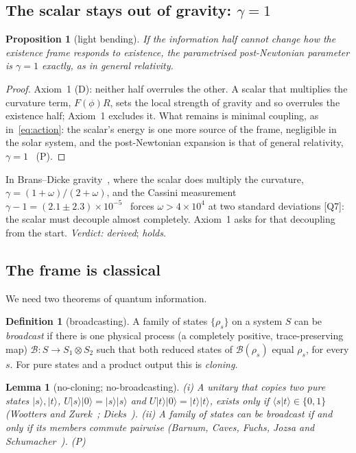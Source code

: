 \documentclass[11pt,a4paper]{article}
\newtheorem{proposition}{Proposition}
\newtheorem{lemma}{Lemma}
\theoremstyle{definition}
\newtheorem{definition}{Definition}
\theoremstyle{remark}
\newcommand{\chk}[1]{\textsf{[#1]}}
\newcommand{\tagD}{\textsf{(D)}}
\newcommand{\tagP}{\textsf{(P)}}
\newcommand{\ket}[1]{\lvert #1\rangle}
\theoremstyle{definition}
\begin{document}
\subsection{The scalar stays out of gravity: \texorpdfstring{$\gamma=1$}{gamma = 1}}

\begin{proposition}[light bending]\label{pr:gamma}
If the information half cannot change how the existence frame responds to existence, the parametrised post-Newtonian parameter is
$\gamma=1$ exactly, as in general relativity.
\end{proposition}

\begin{proof}
Axiom~1 \tagD: neither half overrules the other. A scalar that multiplies the curvature term, $F(\phi)R$, sets the local strength of gravity
and so overrules the existence half; Axiom~1 excludes it. What remains is minimal coupling, as in~\eqref{eq:action}: the scalar's energy is
one more source of the frame, negligible in the solar system, and the post-Newtonian expansion is that of general relativity,
$\gamma=1$~\cite{will} \tagP.
\end{proof}

In Brans--Dicke gravity~\cite{bd}, where the scalar does multiply the curvature, $\gamma=(1+\omega)/(2+\omega)$, and the Cassini
measurement $\gamma-1=(2.1\pm2.3)\times10^{-5}$~\cite{cassini} forces $\omega>4\times10^4$ at two standard deviations \chk{Q7}: the
scalar must decouple almost completely. Axiom~1 asks for that decoupling from the start. \emph{Verdict: derived}; \emph{holds}.

\subsection{The frame is classical}

We need two theorems of quantum information.

\begin{definition}[broadcasting]
A family of states $\{\rho_s\}$ on a system $S$ can be \emph{broadcast} if there is one physical process (a completely positive,
trace-preserving map) $\mathcal B:S\to S_1\otimes S_2$ such that both reduced states of $\mathcal B(\rho_s)$ equal $\rho_s$, for every $s$.
For pure states and a product output this is \emph{cloning}.
\end{definition}

\begin{lemma}[no-cloning; no-broadcasting]\label{lem:nobroadcast}
(i) A unitary that copies two pure states $\ket s,\ket t$, $U\ket s\ket0=\ket s\ket s$ and $U\ket t\ket0=\ket t\ket t$, exists only if
$\langle s|t\rangle\in\{0,1\}$ (Wootters and Zurek~\cite{wz}; Dieks~\cite{dieks}). (ii) A family of states can be broadcast if and only if
its members commute pairwise (Barnum, Caves, Fuchs, Jozsa and Schumacher~\cite{barnum}). \tagP
\end{lemma}
\end{document}
